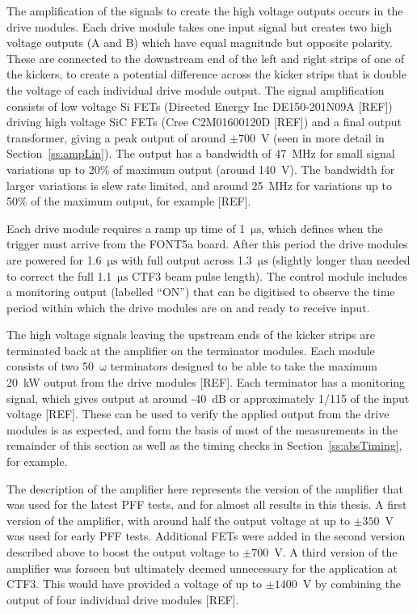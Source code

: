 The amplification of the signals to create the high voltage outputs occurs in the drive modules. Each drive module takes one input signal but creates two high voltage outputs (A and B) which have equal magnitude but opposite polarity. These are connected to the downstream end of the left and right strips of one of the kickers, to create a potential difference across the kicker strips that is double the voltage of each individual drive module output. The signal amplification consists of low voltage Si FETs (Directed Energy Inc DE150-201N09A [REF]) driving high voltage SiC FETs (Cree C2M01600120D [REF]) and a final output transformer, giving a peak output of around \(\pm700\)~V (seen in more detail in Section~\ref{ss:ampLin}). The output has a bandwidth of 47~MHz for small signal variations up to 20\% of maximum output (around 140~V). The bandwidth for larger variations is slew rate limited, and around 25~MHz for variations up to 50\% of the maximum output, for example [REF].

Each drive module requires a ramp up time of 1~\(\mathrm{\mu s}\), which defines when the trigger must arrive from the FONT5a board. After this period the drive modules are powered for 1.6~\(\mathrm{\mu s}\)  with full output across 1.3~\(\mathrm{\mu s}\) (slightly longer than needed to correct the full 1.1~\(\mathrm{\mu s}\) CTF3 beam pulse length). The control module includes a monitoring output (labelled ``ON'') that can be digitised to observe the time period within which the drive modules are on and ready to receive input.

The high voltage signals leaving the upstream ends of the kicker strips are terminated back at the amplifier on the terminator modules. Each module consists of two 50~\(\mathrm{\omega}\) terminators designed to be able to take the maximum 20~kW output from the drive modules [REF]. Each terminator has a monitoring signal, which gives output at around -40~dB or approximately 1/115 of the input voltage [REF]. These can be used to verify the applied output from the drive modules is as expected, and form the basis of most of the measurements in the remainder of this section as well as the timing checks in Section~\ref{ss:absTiming}, for example.

The description of the amplifier here represents the version of the amplifier that was used for the latest PFF tests, and for almost all results in this thesis. A first version of the amplifier, with around half the output voltage at up to \(\pm350\)~V was used for early PFF tests. Additional FETs were added in the second version described above to boost the output voltage to \(\pm700\)~V. A third version of the amplifier was forseen but ultimately deemed unnecessary for the application at CTF3. This would have provided a voltage of up to \(\pm1400\)~V by combining the output of four individual drive modules [REF].

